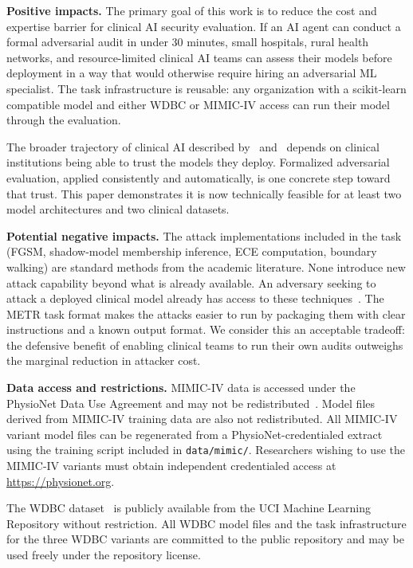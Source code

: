 \documentclass[11pt]{article}
\begin{document}
\textbf{Positive impacts.}
The primary goal of this work is to reduce the cost and expertise barrier for
clinical AI security evaluation. If an AI agent can conduct a formal
adversarial audit in under 30 minutes, small hospitals, rural health networks,
and resource-limited clinical AI teams can assess their models before
deployment in a way that would otherwise require hiring an adversarial ML
specialist. The task infrastructure is reusable: any organization with a
scikit-learn compatible model and either WDBC or MIMIC-IV access can run
their model through the evaluation.

The broader trajectory of clinical AI described by~\citet{rajpurkar2022ai}
and~\citet{topol2019high} depends on clinical institutions being able to
trust the models they deploy. Formalized adversarial evaluation, applied
consistently and automatically, is one concrete step toward that trust. This
paper demonstrates it is now technically feasible for at least two model
architectures and two clinical datasets.

\textbf{Potential negative impacts.}
The attack implementations included in the task (FGSM, shadow-model membership
inference, ECE computation, boundary walking) are standard methods from the
academic literature. None introduce new attack capability beyond what is
already available. An adversary seeking to attack a deployed clinical model
already has access to these techniques~\citep{papernot2018sok}. The METR
task format makes the attacks easier to run by packaging them with clear
instructions and a known output format. We consider this an acceptable
tradeoff: the defensive benefit of enabling clinical teams to run their own
audits outweighs the marginal reduction in attacker cost.

\textbf{Data access and restrictions.}
MIMIC-IV data is accessed under the PhysioNet Data Use Agreement and may not
be redistributed~\citep{goldberger2000physiobank,johnson2023mimic}. Model
files derived from MIMIC-IV training data are also not redistributed. All
MIMIC-IV variant model files can be regenerated from a PhysioNet-credentialed
extract using the training script included in \texttt{data/mimic/}. Researchers
wishing to use the MIMIC-IV variants must obtain independent credentialed
access at \url{https://physionet.org}.

The WDBC dataset~\citep{dua2019uci} is publicly available from the UCI
Machine Learning Repository without restriction. All WDBC model files and
the task infrastructure for the three WDBC variants are committed to the
public repository and may be used freely under the repository license.
\end{document}
